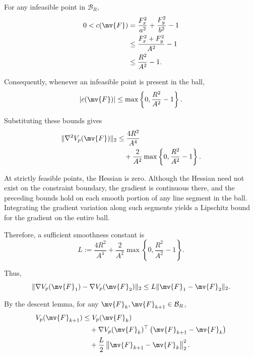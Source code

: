 For any infeasible point in $\mathcal{B}_R$,
\begin{equation}
	\begin{aligned}
		0<c(\mv{F})
		 & =
		\frac{F_x^2}{a^2}
		+
		\frac{F_y^2}{b^2}
		-
		1
		\\
		 & \leq
		\frac{F_x^2+F_y^2}{A^2}
		-
		1
		\\
		 & \leq
		\frac{R^2}{A^2}
		-
		1
		.
	\end{aligned}
\end{equation}

Consequently, whenever an infeasible point is present in the ball,
\begin{equation}
	|c(\mv{F})|
	\leq
	\max
	\left\{
	0,
	\frac{R^2}{A^2}-1
	\right\}
	.
\end{equation}

Substituting these bounds gives
\begin{equation}
	\begin{aligned}
		\|\nabla^2 V_p(\mv{F})\|_2
		 & \leq
		\frac{4R^2}{A^4}
		\\
		 & \quad+
		\frac{2}{A^2}
		\max
		\left\{
		0,
		\frac{R^2}{A^2}-1
		\right\}
		.
	\end{aligned}
\end{equation}

At strictly feasible points, the Hessian is zero. Although the Hessian need not
exist on the constraint boundary, the gradient is continuous there, and the
preceding bounds hold on each smooth portion of any line segment in the ball.
Integrating the gradient variation along such segments yields a Lipschitz bound
for the gradient on the entire ball.

Therefore, a sufficient smoothness constant is
\begin{equation}
	\label{Tire:eq:energy:smoothness}
	\boxed{
		L
		:=
		\frac{4R^2}{A^4}
		+
		\frac{2}{A^2}
		\max
		\left\{
		0,
		\frac{R^2}{A^2}-1
		\right\}
	}
	.
\end{equation}

Thus,
\begin{equation}
	\|\nabla V_p(\mv{F}_1)
	-
	\nabla V_p(\mv{F}_2)\|_2
	\leq
	L\|\mv{F}_1-\mv{F}_2\|_2
	.
\end{equation}

By the descent lemma, for any $\mv{F}_k,\mv{F}_{k+1}\in\mathcal{B}_R$,
\begin{equation}
	\label{Tire:eq:ellipse:descent:lemma}
	\begin{aligned}
		V_p(\mv{F}_{k+1})
		 & \leq
		V_p(\mv{F}_k)
		\\
		 & \quad+
		\nabla V_p(\mv{F}_k)^\top
		\left(
		\mv{F}_{k+1}-\mv{F}_k
		\right)
		\\
		 & \quad+
		\frac{L}{2}
		\left\|
		\mv{F}_{k+1}-\mv{F}_k
		\right\|_2^2
		.
	\end{aligned}
\end{equation}

